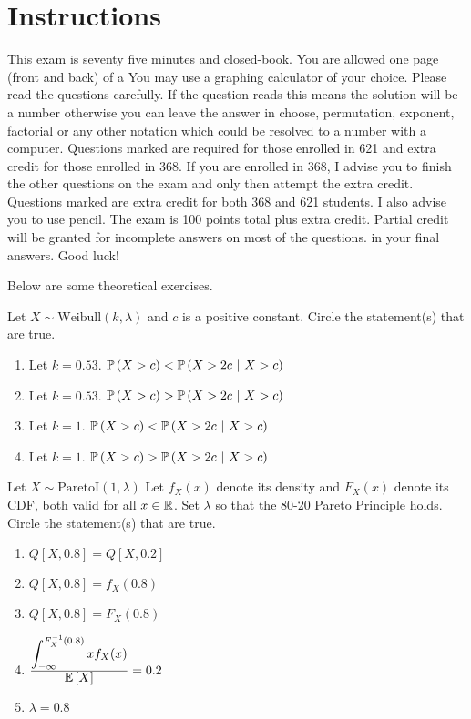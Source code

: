 \documentclass[12pt]{article}
\begin{document}
\section*{Instructions}

This exam is seventy five minutes and closed-book. You are allowed one page (front and back) of a  You may use a graphing calculator of your choice. Please read the questions carefully. If the question reads  this means the solution will be a number otherwise you can leave the answer in choose, permutation, exponent, factorial or any other notation which could be resolved to a number with a computer. Questions marked \qu{[MA]} are required for those enrolled in 621 and extra credit for those enrolled in 368. If you are enrolled in 368, I advise you to finish the other questions on the exam and only then attempt the extra credit. Questions marked  are extra credit for both 368 and 621 students. I also advise you to use pencil. The exam is 100 points total plus extra credit. Partial credit will be granted for incomplete answers on most of the questions.  in your final answers. Good luck!

\pagebreak

\problem Below are some theoretical exercises.


\benum


 Let $X \sim \text{Weibull}(k, \lambda)$ and $c$ is a positive constant. Circle the statement(s) that are true.

\begin{enumerate}
\item Let $k = 0.53$. $\mathbb{P}\left(X > c\right) < \mathbb{P}\left(X > 2c~|~X > c\right)$
\item Let $k = 0.53$. $\mathbb{P}\left(X > c\right) > \mathbb{P}\left(X > 2c~|~X > c\right)$
\item Let $k = 1$. $\mathbb{P}\left(X > c\right) < \mathbb{P}\left(X > 2c~|~X > c\right)$
\item Let $k = 1$. $\mathbb{P}\left(X > c\right) > \mathbb{P}\left(X > 2c~|~X > c\right)$
\end{enumerate}

 Let $X \sim \text{ParetoI}(1, \lambda)$ Let $f_X(x)$ denote its density and $F_X(x)$ denote its CDF, both valid for all $x \in \mathbb{R}$. Set $\lambda$ so that the 80-20 Pareto Principle holds. Circle the statement(s) that are true.

\begin{enumerate}
\item $Q[X, 0.8] = Q[X, 0.2]$
\item $Q[X, 0.8] = f_X(0.8)$
\item $Q[X, 0.8] = F_X(0.8)$
\item $ \frac{\displaystyle\int_{-\infty}^{F^{-1}_X(0.8)} x f_X(x)}{\displaystyle\mathbb{E}\left[X\right]} = 0.2$
\item $\lambda = 0.8$
\end{enumerate}
\end{document}
